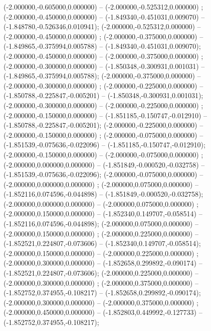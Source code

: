  (-2.000000,-0.605000,0.000000) -- (-2.000000,-0.525312,0.000000) ;
 (-2.000000,-0.450000,0.000000) -- (-1.849340,-0.451031,0.009070) -- (-1.848780,-0.526346,0.010941);
 (-2.000000,-0.525312,0.000000) -- (-2.000000,-0.450000,0.000000) ;
 (-2.000000,-0.375000,0.000000) -- (-1.849865,-0.375994,0.005788) -- (-1.849340,-0.451031,0.009070);
 (-2.000000,-0.450000,0.000000) -- (-2.000000,-0.375000,0.000000) ;
 (-2.000000,-0.300000,0.000000) -- (-1.850348,-0.300931,0.001031) -- (-1.849865,-0.375994,0.005788);
 (-2.000000,-0.375000,0.000000) -- (-2.000000,-0.300000,0.000000) ;
 (-2.000000,-0.225000,0.000000) -- (-1.850788,-0.225847,-0.005201) -- (-1.850348,-0.300931,0.001031);
 (-2.000000,-0.300000,0.000000) -- (-2.000000,-0.225000,0.000000) ;
 (-2.000000,-0.150000,0.000000) -- (-1.851185,-0.150747,-0.012910) -- (-1.850788,-0.225847,-0.005201);
 (-2.000000,-0.225000,0.000000) -- (-2.000000,-0.150000,0.000000) ;
 (-2.000000,-0.075000,0.000000) -- (-1.851539,-0.075636,-0.022096) -- (-1.851185,-0.150747,-0.012910);
 (-2.000000,-0.150000,0.000000) -- (-2.000000,-0.075000,0.000000) ;
 (-2.000000,0.000000,0.000000) -- (-1.851849,-0.000520,-0.032758) -- (-1.851539,-0.075636,-0.022096);
 (-2.000000,-0.075000,0.000000) -- (-2.000000,0.000000,0.000000) ;
 (-2.000000,0.075000,0.000000) -- (-1.852116,0.074596,-0.044898) -- (-1.851849,-0.000520,-0.032758);
 (-2.000000,0.000000,0.000000) -- (-2.000000,0.075000,0.000000) ;
 (-2.000000,0.150000,0.000000) -- (-1.852340,0.149707,-0.058514) -- (-1.852116,0.074596,-0.044898);
 (-2.000000,0.075000,0.000000) -- (-2.000000,0.150000,0.000000) ;
 (-2.000000,0.225000,0.000000) -- (-1.852521,0.224807,-0.073606) -- (-1.852340,0.149707,-0.058514);
 (-2.000000,0.150000,0.000000) -- (-2.000000,0.225000,0.000000) ;
 (-2.000000,0.300000,0.000000) -- (-1.852658,0.299892,-0.090174) -- (-1.852521,0.224807,-0.073606);
 (-2.000000,0.225000,0.000000) -- (-2.000000,0.300000,0.000000) ;
 (-2.000000,0.375000,0.000000) -- (-1.852752,0.374955,-0.108217) -- (-1.852658,0.299892,-0.090174);
 (-2.000000,0.300000,0.000000) -- (-2.000000,0.375000,0.000000) ;
 (-2.000000,0.450000,0.000000) -- (-1.852803,0.449992,-0.127733) -- (-1.852752,0.374955,-0.108217);
